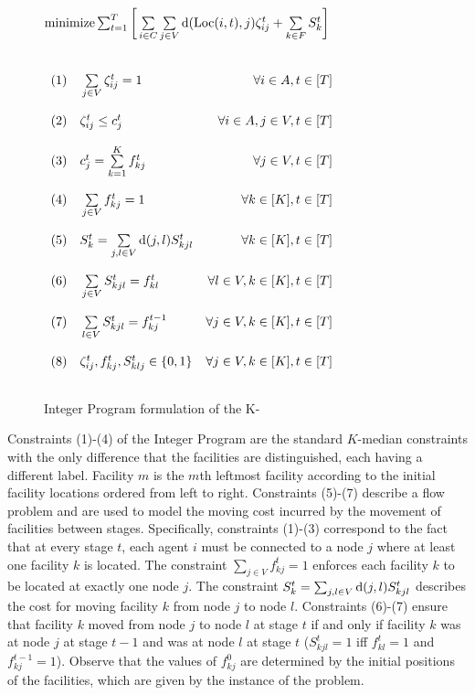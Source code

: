 
\begin{figure}
\centering
$
\text{minimize}\sum _{t=1}^T \bigg[ \sum\limits_{i\in 
  C}\sum\limits_{j\in V} \mathrm{d}(\mathrm{Loc}(i,t),j)\zeta_{ij}^t + \sum\limits_{k\in F} S_k^t \bigg] $
$
\begin{array}{lr}
\\\\
(1) \,\,\,\,\,\,  \sum \limits_{j \in V}\zeta_{ij}^t=1  &\forall i \in A,t \in [T]  \\\\
(2) \,\,\,\,\,\,	\zeta_{ij}^t \leq c_j^t&\forall i \in A,j \in V,t \in [T]\\\\
(3) \,\,\,\,\,\,     c_j^t=\sum\limits_{k=1}^{K} f_{kj}^t & \forall j \in V, t\in [T]\\\\
(4) \,\,\,\,\,\,    \sum \limits_{j \in V} f_{kj}^t=1 & \forall k\in [K], t\in [T]\\\\
(5) \,\,\,\,\,\,        S_k^t = \sum \limits_{j,l \in V} \mathrm{d}(j,l)S_{kjl}^t & \forall k \in [K], t\in [T] \\\\
(6) \,\,\,\,\,\,        \sum \limits_{j \in V} S_{kjl}^t =f_{kl}^t & \forall l \in V,k \in [K],t\in [T]\\\\
(7) \,\,\,\,\,\,       \sum \limits_{l \in V} S_{kjl}^t = f_{kj}^{t-1} & \forall j \in V,k \in [K],t\in [T]\\\\
(8) \,\,\,\,\,\,        \zeta_{ij}^t,f_{kj}^t,S_{klj}^t \in \{0,1 \} & \forall j \in V,k \in [K],t\in [T]\\\\
\end{array}
$
\caption{Integer Program formulation of the K- }
\label{LP_Reallocation}
\end{figure}

Constraints (1)-(4) of the Integer Program are the standard $K$-median constraints with the only difference that the  facilities are distinguished, each having a different label. Facility $m$ is the $m$th leftmost facility according to the initial facility locations ordered from left to right. Constraints (5)-(7) describe a flow problem and are used to model the moving cost incurred by the movement of facilities between stages.
Specifically, constraints (1)-(3) correspond to the fact that at every stage $t$, each 
agent $i$ must be connected
to a node $j$ where at least one facility $k$ is located.
The constraint $\sum_{j \in V} f_{kj}^t=1$ enforces each facility $k$ to be located 
at exactly one node $j$.
The constraint $S_k^t = \sum_{j,l \in V} \mathrm{d}(j,l)S_{kjl}^t$ describes the cost for 
moving facility $k$ from node $j$ to node $l$.
Constraints (6)-(7) ensure that facility $k$ moved from node $j$ to node 
$l$ at stage $t$ if and only if
facility $k$ was at node $j$ at stage $t-1$ and was at node $l$ at stage $t$
($S_{kjl}^t = 1$ iff $f_{kl}^t=1$ and $f_{kj}^{t-1}=1$). 
Observe that the values of $f_{kj}^0$ are determined by the initial positions
of the facilities, which are given by the instance of the problem. 

